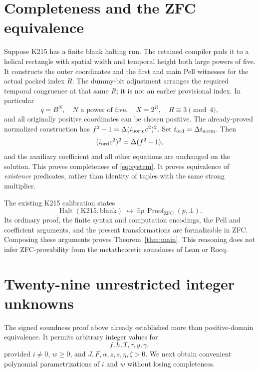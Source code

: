 \documentclass[11pt,a4paper]{article}
\theoremstyle{remark}\newtheorem{remark}[theorem]{Remark}
\begin{document}
\section{Completeness and the ZFC equivalence}\label{sec:complete}
Suppose K215 has a finite blank halting run. The retained compiler pads
it to a helical rectangle with spatial width and temporal height both
large powers of five. It constructs the outer coordinates and the
first and main Pell witnesses for the actual packed index $R$.
The dummy-bit adjustment arranges the required temporal congruence
at that same $R$; it is not an earlier provisional index. In particular
\[
 q=B^N,\quad N\text{ a power of five},\quad X=2^R,
 \quad R\equiv3\pmod4,
\]
and all originally positive coordinates can be chosen positive.
The already-proved normalized construction has
$f^2-1=\Delta(i_{\rm norm}c^2)^2$.
Set $i_{\rm ord}=\Delta i_{\rm norm}$. Then
\[
 (i_{\rm ord}c^2)^2=\Delta(f^2-1),
\]
and the auxiliary coefficient and all other equations are unchanged
on the solution. This proves completeness of \eqref{eq:system}.
It proves equivalence of \emph{existence} predicates, rather than
identity of tuples with the same strong multiplier.

The existing K215 calibration states
\[
 \operatorname{Halt}(\mathrm{K215},\mathrm{blank})
 \ \longleftrightarrow\ \exists p\,
 \operatorname{Proof}_{\mathrm{ZFC}}(p,\bot).
\]
Its ordinary proof, the finite syntax and computation encodings, the
Pell and coefficient arguments, and the present transformations are
formalizable in ZFC. Composing these arguments proves
Theorem~\ref{thm:main}. This reasoning does not infer ZFC-provability
from the metatheoretic soundness of Lean or Rocq.

\section{Twenty-nine unrestricted integer unknowns}\label{sec:integer}
The signed soundness proof above already established more than
positive-domain equivalence. It permits arbitrary integer values for
\[
 f,h,T,\tau,y,\gamma,
\]
provided $i\ne0$, $w\ge0$, and
$J,F,\alpha,z,s,\eta,\zeta>0$. We next obtain convenient polynomial
parametrizations of $i$ and $w$ without losing completeness.
\end{document}
